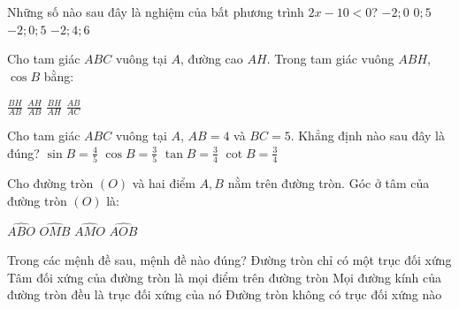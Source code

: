 \documentclass[12pt,a4paper]{article}
\begin{document}
\begin{ex}
Những số nào sau đây là nghiệm của bất phương trình $2x - 10 < 0$?
\choice
{\True $-2; 0$}
{$0; 5$}
{$-2; 0; 5$}
{$-2; 4; 6$}
\end{ex}

\begin{ex}
Cho tam giác $ABC$ vuông tại $A$, đường cao $AH$. Trong tam giác vuông $ABH$, $\cos B$ bằng:
\begin{center}
\end{center}
\choice
{\True $\frac{BH}{AB}$}
{$\frac{AH}{AB}$}
{$\frac{BH}{AH}$}
{$\frac{AB}{AC}$}
\end{ex}

\begin{ex}
Cho tam giác $ABC$ vuông tại $A$, $AB = 4$ và $BC = 5$. Khẳng định nào sau đây là đúng?
\choice
{$\sin B = \frac{4}{5}$}
{$\cos B = \frac{3}{5}$}
{\True $\tan B = \frac{3}{4}$}
{$\cot B = \frac{3}{4}$}
\end{ex}

\begin{ex}
Cho đường tròn $(O)$ và hai điểm $A, B$ nằm trên đường tròn. Góc ở tâm của đường tròn $(O)$ là:
\begin{center}
\end{center}
\choice
{$\widehat{ABO}$}
{$\widehat{OMB}$}
{$\widehat{AMO}$}
{\True $\widehat{AOB}$}
\end{ex}

\begin{ex}
Trong các mệnh đề sau, mệnh đề nào đúng?
\choice
{Đường tròn chỉ có một trục đối xứng}
{Tâm đối xứng của đường tròn là mọi điểm trên đường tròn}
{\True Mọi đường kính của đường tròn đều là trục đối xứng của nó}
{Đường tròn không có trục đối xứng nào}
\end{ex}
\end{document}
